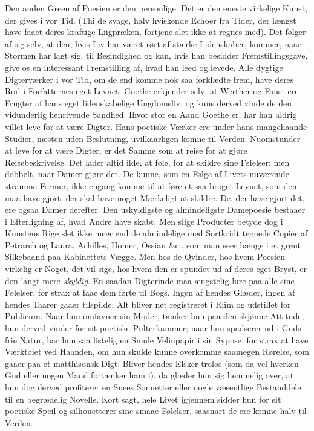 \documentclass[12pt]{article}
\newcommand{\opage}[1]{\marginnote{\footnotesize\textit{[#1]}}}
\begin{document}
Den anden Green af Poesien er den personlige. Det er den eneste virkelige Kunst,
der gives i vor Tid. (Thi de svage, halv hviskende Echoer fra Tider, der længst
have faaet deres kraftige Liigpræken, fortjene slet ikke at regnes med). Det
følger af sig selv, at den, hvis Liv har været rørt af stærke Lidenskaber, kommer,
naar Stormen har lagt sig, til Besindighed og kan, \opage{12}hvis han besidder
Fremstillingsgave, give os en interessant Fremstilling af, hvad han leed og
levede. Alle dygtige Digterværker i vor Tid, om de end komme nok saa forklædte
frem, have deres Rod i Forfatternes eget Levnet. Goethe erkjender selv, at Werther
og Faust ere Frugter af hans eget lidenskabelige Ungdomsliv, og kuns derved vinde
de den vidunderlig henrivende Sandhed. Ihvor stor en Aand Goethe er, har han
aldrig villet leve for at være Digter. Hans poetiske Værker ere under hans
mangehaande Studier, næsten uden Beslutning, uvilkaarligen komne til Verden.
Nuomstunder at leve for at være Digter, er det Samme som at reise for at gjøre
Reisebeskrivelse. Det lader altid ilde, at føle, for at skildre sine Følelser; men
dobbelt, naar Damer gjøre det. De kunne, som en Følge af Livets nuværende stramme
Former, ikke engang komme til at føre et saa broget Levnet, som den maa have
gjort, der skal have noget Mærkeligt at skildre. De, der have gjort det, ere ogsaa
Damer derefter. Den uskyldigste og almindeligste Damepoesie bestaaer i
Efterligning af, hvad Andre have skabt. Men slige Producter betyde dog i Kunstens
Rige slet ikke meer end de almindelige med Sortkridt tegnede Copier af Petrarch og
Laura, Achilles, Homer, Ossian \&c., som man seer hænge i et grønt Silkebaand paa
Kabinettets Vægge. Men hos de Qvinder, hos hvem Poesien virkelig er Noget, det vil
sige, hos hvem den er spundet ud af deres eget Bryst, er den langt mere
\emph{skyldig}. En saadan Digterinde maa ængstelig lure paa alle sine Følelser,
for strax at faae dem førte til Bogs. Ingen af hendes Glæder, ingen af hendes
Taarer gaaer tilspilde; Alt bliver net registreret i Riim og udstillet for
Publicum. Naar hun omfavner sin Moder, tænker hun paa den skjønne Attitude, hun
derved vinder for sit poetiske Pulterkammer; naar hun spadserer ud i Guds frie
Natur, har hun saa listelig en Smule Velinpapir i sin Sypose, for strax at have
Værktøiet ved Haanden, om hun skulde kunne overkomme saamegen Rørelse, som gaaer
\opage{13}paa et matthisonsk Digt. Bliver hendes Elsker troløs (som da vel hverken
Gud eller nogen Mand fortænker ham i), da glæder hun sig hemmelig over, at hun dog
derved profiterer en Snees Sonnetter eller nogle væsentlige Bestanddele til en
begrædelig Novelle. Kort sagt, hele Livet igjennem sidder hun for sit poetiske
Speil og silhouetterer sine smaae Følelser, saasnart de ere komne halv til Verden.
\end{document}
